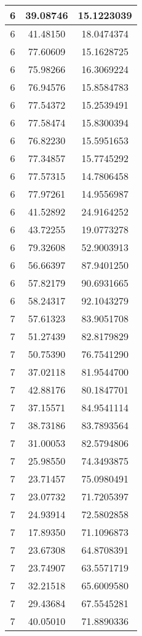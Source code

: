 \documentclass[
]{book}
\begin{document}
\begin{tabular}{c|c|c}
\hline
6 & 39.08746 & 15.1223039\\
\hline
6 & 41.48150 & 18.0474374\\
\hline
6 & 77.60609 & 15.1628725\\
\hline
6 & 75.98266 & 16.3069224\\
\hline
6 & 76.94576 & 15.8584783\\
\hline
6 & 77.54372 & 15.2539491\\
\hline
6 & 77.58474 & 15.8300394\\
\hline
6 & 76.82230 & 15.5951653\\
\hline
6 & 77.34857 & 15.7745292\\
\hline
6 & 77.57315 & 14.7806458\\
\hline
6 & 77.97261 & 14.9556987\\
\hline
6 & 41.52892 & 24.9164252\\
\hline
6 & 43.72255 & 19.0773278\\
\hline
6 & 79.32608 & 52.9003913\\
\hline
6 & 56.66397 & 87.9401250\\
\hline
6 & 57.82179 & 90.6931665\\
\hline
6 & 58.24317 & 92.1043279\\
\hline
7 & 57.61323 & 83.9051708\\
\hline
7 & 51.27439 & 82.8179829\\
\hline
7 & 50.75390 & 76.7541290\\
\hline
7 & 37.02118 & 81.9544700\\
\hline
7 & 42.88176 & 80.1847701\\
\hline
7 & 37.15571 & 84.9541114\\
\hline
7 & 38.73186 & 83.7893564\\
\hline
7 & 31.00053 & 82.5794806\\
\hline
7 & 25.98550 & 74.3493875\\
\hline
7 & 23.71457 & 75.0980491\\
\hline
7 & 23.07732 & 71.7205397\\
\hline
7 & 24.93914 & 72.5802858\\
\hline
7 & 17.89350 & 71.1096873\\
\hline
7 & 23.67308 & 64.8708391\\
\hline
7 & 23.74907 & 63.5571719\\
\hline
7 & 32.21518 & 65.6009580\\
\hline
7 & 29.43684 & 67.5545281\\
\hline
7 & 40.05010 & 71.8890336\\

\end{tabular}
\end{document}
